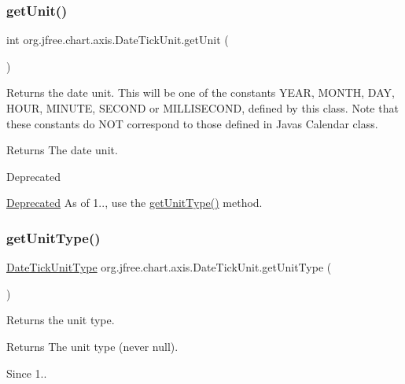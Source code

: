 \subsubsection{\texorpdfstring{get\+Unit()}{getUnit()}}
{\footnotesize\ttfamily int org.\+jfree.\+chart.\+axis.\+Date\+Tick\+Unit.\+get\+Unit (\begin{DoxyParamCaption}{ }\end{DoxyParamCaption})}

Returns the date unit. This will be one of the constants {\ttfamily Y\+E\+AR}, {\ttfamily M\+O\+N\+TH}, {\ttfamily D\+AY}, {\ttfamily H\+O\+UR}, {\ttfamily M\+I\+N\+U\+TE}, {\ttfamily S\+E\+C\+O\+ND} or {\ttfamily M\+I\+L\+L\+I\+S\+E\+C\+O\+ND}, defined by this class. Note that these constants do N\+OT correspond to those defined in Java\textquotesingle{}s {\ttfamily Calendar} class.

\begin{DoxyReturn}{Returns}
The date unit.
\end{DoxyReturn}
\begin{DoxyRefDesc}{Deprecated}
\item[\mbox{\hyperlink{deprecated__deprecated000018}{Deprecated}}]As of 1.., use the \mbox{\hyperlink{classorg_1_1jfree_1_1chart_1_1axis_1_1_date_tick_unit_a5fcf378adb505a306a48a79dad997772}{get\+Unit\+Type()}} method. \end{DoxyRefDesc}
\mbox{\label{classorg_1_1jfree_1_1chart_1_1axis_1_1_date_tick_unit_a5fcf378adb505a306a48a79dad997772}} 
\subsubsection{\texorpdfstring{get\+Unit\+Type()}{getUnitType()}}
{\footnotesize\ttfamily \mbox{\hyperlink{classorg_1_1jfree_1_1chart_1_1axis_1_1_date_tick_unit_type}{Date\+Tick\+Unit\+Type}} org.\+jfree.\+chart.\+axis.\+Date\+Tick\+Unit.\+get\+Unit\+Type (\begin{DoxyParamCaption}{ }\end{DoxyParamCaption})}

Returns the unit type.

\begin{DoxyReturn}{Returns}
The unit type (never {\ttfamily null}).
\end{DoxyReturn}
\begin{DoxySince}{Since}
1.. 
\end{DoxySince}
\mbox{\label{classorg_1_1jfree_1_1chart_1_1axis_1_1_date_tick_unit_a8bcaf93f97c1d434ae3a84e0957001b8}} 
